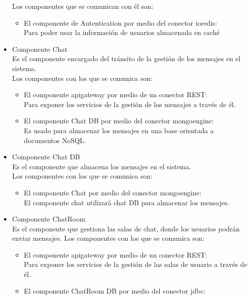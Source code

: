 \begin{itemize}
     Los componentes que se comunican con él son:
     \begin{itemize}
        \item El componente de Autentication por medio del conector ioredis:\\
        Para poder usar la información de usuarios almacenada en caché
    \end{itemize}
    \item Componente Chat\\
    Es el componente encargado del tránsito de la gestión de los mensajes en el sistema.\\
    Los componentes con los que se comunica son:
    \begin{itemize}
        \item El componente api\textunderscore gateway por medio de un conector REST:\\
        Para exponer los servicios de la gestión de los mensajes a través de él.
        \item El componente Chat DB por medio del conector mongoengine:\\
        Es usado para almacenar los mensajes en una base orientada a documentos NoSQL.
    \end{itemize}
    \item Componente Chat DB\\
    Es el componente que almacena los mensajes en el sistema.\\
    Los componentes con los que se comunica son:
    \begin{itemize}
        \item El componente Chat por medio del conector mongoengine:\\
        El componente chat utilizará chat DB  para almacenar los mensajes.
    \end{itemize}
    \item Componente ChatRoom\\
    Es el componente que gestiona las salas de chat, donde los usuarios podrán enviar mensajes.
    Los componentes con los que se comunica son:
    \begin{itemize}
        \item El componente api\textunderscore gateway por medio de un conector REST:\\
        Para exponer los servicios de la gestión de las salas de usuario a través de él.
        \item El componente ChatRoom DB por medio del conector jdbc:\\

\end{itemize}
\end{itemize}
